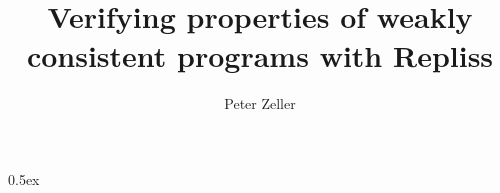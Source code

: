 \documentclass[11pt,a4paper]{article}
\begin{document}
\title{Verifying properties of weakly consistent programs with Repliss}
\author{Peter Zeller}
\maketitle

\tableofcontents

\parindent 0pt\parskip 0.5ex



%
%
\end{document}
